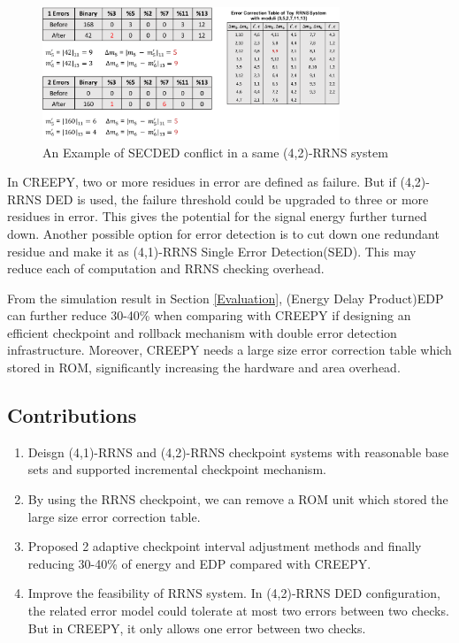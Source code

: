 \documentclass{sig-alternate}
\begin{document}
\begin{figure}[H]
\centering
\includegraphics[width=3.5in]{graphics/SECorDED.pdf}

\caption{An Example of SECDED conflict in a same (4,2)-RRNS system}
\label{fig_SECDED}
\end{figure}

In CREEPY, two or more residues in error are defined as failure. But if (4,2)-RRNS DED is used, the failure threshold could be upgraded to three or more residues in error. This gives the potential for the signal energy further turned down. Another possible option for error detection is to cut down one redundant residue and make it as (4,1)-RRNS Single Error Detection(SED). This may reduce each of computation and RRNS checking overhead. 

From the simulation result in Section \ref{Evaluation}, (Energy Delay Product)EDP can further reduce 30-40\% when comparing  with CREEPY if designing an efficient checkpoint and rollback mechanism with double error detection infrastructure. Moreover, CREEPY needs a large size error correction table which stored in ROM, significantly increasing the hardware and area overhead. 

\subsection{Contributions}
\begin{enumerate}
\item Deisgn (4,1)-RRNS and (4,2)-RRNS checkpoint systems with reasonable base sets and supported incremental checkpoint mechanism. 
\item By using the RRNS checkpoint, we can remove a ROM unit which stored the large size error correction table. 
\item Proposed 2 adaptive checkpoint interval adjustment methods and finally reducing 30-40\% of energy and EDP compared with CREEPY. 
\item Improve the feasibility of RRNS system. In  (4,2)-RRNS DED configuration, the related error model could tolerate at most two errors between two checks. But in CREEPY, it only allows one error between two checks. 
\end{enumerate}
\end{document}
